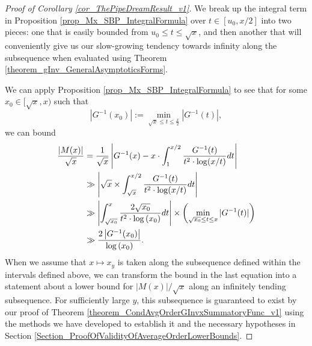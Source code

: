 \documentclass[11pt,reqno,a4letter]{article}
\numberwithin{figure}{section}
\numberwithin{table}{section}
\theoremstyle{plain}
\numberwithin{theorem}{section}
\theoremstyle{definition}
\begin{document}
\begin{proof}[Proof of Corollary \ref{cor_ThePipeDreamResult_v1}] 
\label{proofOf_cor_ThePipeDreamResult_v1} 
We break up the integral term in 
Proposition \ref{prop_Mx_SBP_IntegralFormula} 
over $t \in [u_0, x/2]$ into two pieces: one that is easily bounded 
from $u_0 \leq t \leq \sqrt{x}$, 
and then another that will conveniently give us our slow-growing tendency towards 
infinity along the subsequence when evaluated using 
Theorem \ref{theorem_gInv_GeneralAsymptoticsForms}. 

We can apply Proposition \ref{prop_Mx_SBP_IntegralFormula} to see that 
for some $x_0 \in [\sqrt{x}, x)$ such that 
\[
\left\lvert G^{-1}(x_0) \right\rvert := 
     \min_{\sqrt{x} \leq t \leq \frac{x}{2}} |G^{-1}(t)|, 
\]
we can bound 
\begin{align} 
\notag 
\frac{|M(x)|}{\sqrt{x}} & = 
     \frac{1}{\sqrt{x}} \left\lvert G^{-1}(x) - x \cdot \int_1^{x/2} \frac{G^{-1}(t)}{ 
     t^2 \cdot \log(x/t)} dt \right\rvert \\ 
\notag 
     & \gg 
     \left\lvert \sqrt{x} \times \int_{\sqrt{x}}^{x/2} \frac{G^{-1}(t)}{ 
     t^2 \cdot \log(x/t)} dt \right\rvert \\ 
\notag 
     & \gg \left\lvert \int_{\sqrt{x_0}}^{x} \frac{2 \sqrt{x_0}}{ 
     t^2 \cdot \log\left(x_0\right)} dt \right\rvert 
     \times \left( 
     \min_{\sqrt{x_0} \leq t \leq x} |G^{-1}(t)| 
     \right) \\ 
\label{eqn_MxGInvxLowerBound_stmt_v1} 
     & \gg  
     \frac{2 \left\lvert G^{-1}(x_0) \right\rvert}{\log\left(x_0\right)}. 
\end{align} 
When we assume that $x \mapsto x_y$ is taken along the 
subsequence defined within the intervals defined above, we can transform the bound in the last 
equation into a statement about a lower bound for $|M(x)| / \sqrt{x}$ along an infinitely tending 
subsequence. 
For sufficiently large $y$, this subsequence is guaranteed to exist by our proof of 
Theorem \ref{theorem_CondAvgOrderGInvxSummatoryFunc_v1} 
using the methods we have developed to establish it and the necessary hypotheses in 
Section \ref{Section_ProofOfValidityOfAverageOrderLowerBounds}. 


\end{proof}
\end{document}

